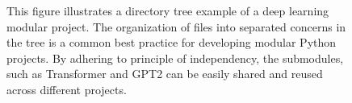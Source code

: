 






\begin{figure}
\centering
{}
\caption{
This figure illustrates a directory tree example of a deep learning modular project. The organization of files into separated concerns in the tree is a common best practice for developing modular Python projects. By adhering to principle of independency, the submodules, such as Transformer and GPT2 can be easily shared and reused across different projects. 
}
\end{figure}



